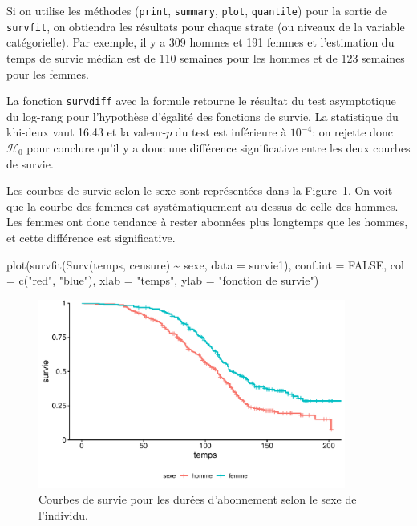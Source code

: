 \documentclass[
  11pt,
  letterpaper,
]{scrbook}
\newenvironment{Shaded}{\begin{snugshade}}{\end{snugshade}}
\newcommand{\AttributeTok}[1]{\textcolor[rgb]{0.40,0.45,0.13}{#1}}
\newcommand{\ConstantTok}[1]{\textcolor[rgb]{0.56,0.35,0.01}{#1}}
\newcommand{\FunctionTok}[1]{\textcolor[rgb]{0.28,0.35,0.67}{#1}}
\newcommand{\NormalTok}[1]{\textcolor[rgb]{0.00,0.23,0.31}{#1}}
\newcommand{\SpecialCharTok}[1]{\textcolor[rgb]{0.37,0.37,0.37}{#1}}
\newcommand{\StringTok}[1]{\textcolor[rgb]{0.13,0.47,0.30}{#1}}
\theoremstyle{definition}
\theoremstyle{remark}
\begin{document}
Si on utilise les méthodes (\texttt{print}, \texttt{summary},
\texttt{plot}, \texttt{quantile}) pour la sortie de \texttt{survfit}, on
obtiendra les résultats pour chaque strate (ou niveaux de la variable
catégorielle). Par exemple, il y a 309 hommes et 191 femmes et
l'estimation du temps de survie médian est de 110 semaines pour les
hommes et de 123 semaines pour les femmes.

La fonction \texttt{survdiff} avec la formule retourne le résultat du
test asymptotique du log-rang pour l'hypothèse d'égalité des fonctions
de survie. La statistique du khi-deux vaut 16.43 et la valeur-\(p\) du
test est inférieure à \(10^{-4}\): on rejette donc \(\mathscr{H}_0\)
pour conclure qu'il y a donc une différence significative entre les deux
courbes de survie.

Les courbes de survie selon le sexe sont représentées dans la
Figure~\ref{fig-survie-comparaison-courbes}. On voit que la courbe des
femmes est systématiquement au-dessus de celle des hommes. Les femmes
ont donc tendance à rester abonnées plus longtemps que les hommes, et
cette différence est significative.

\begin{Shaded}
\begin{Highlighting}[]
\FunctionTok{plot}\NormalTok{(}\FunctionTok{survfit}\NormalTok{(}\FunctionTok{Surv}\NormalTok{(temps, censure) }\SpecialCharTok{\textasciitilde{}}\NormalTok{ sexe, }
             \AttributeTok{data =}\NormalTok{ survie1), }
     \AttributeTok{conf.int =} \ConstantTok{FALSE}\NormalTok{,}
     \AttributeTok{col =} \FunctionTok{c}\NormalTok{(}\StringTok{"red"}\NormalTok{, }\StringTok{"blue"}\NormalTok{), }
     \AttributeTok{xlab =} \StringTok{"temps"}\NormalTok{, }
     \AttributeTok{ylab =} \StringTok{"fonction de survie"}\NormalTok{)}
\end{Highlighting}
\end{Shaded}

\begin{figure}[ht!]

{\centering \includegraphics[width=0.9\textwidth,height=\textheight]{./06-survie_files/figure-pdf/fig-survie-comparaison-courbes-1.pdf}

}

\caption{\label{fig-survie-comparaison-courbes}Courbes de survie pour
les durées d'abonnement selon le sexe de l'individu.}

\end{figure}
\end{document}
